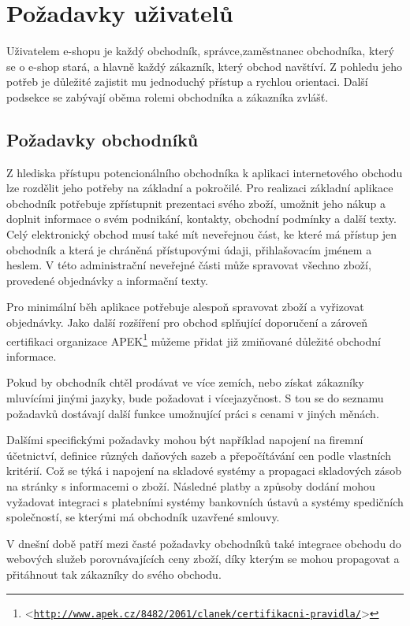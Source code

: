 \documentclass[11pt,twoside,a4paper]{book}
\let\oldUrl\url
\renewcommand\url[1]{<\texttt{\oldUrl{#1}}>}
\begin{document}
\section{Požadavky uživatelů}
\label{potreby3}
Uživatelem e-shopu je každý obchodník, správce,zaměstnanec obchodníka, který se o e-shop stará, a hlavně každý zákazník, který obchod navštíví. Z pohledu jeho potřeb je důležité zajistit mu jednoduchý přístup a rychlou orientaci. Další podsekce se zabývají oběma rolemi obchodníka a zákazníka zvlášť. 

\subsection{Požadavky obchodníků}
\label{potreby1}
Z hlediska přístupu potencionálního obchodníka k aplikaci internetového obchodu lze rozdělit jeho potřeby na základní a pokročilé. Pro realizaci základní aplikace obchodník potřebuje zpřístupnit prezentaci svého zboží, umožnit jeho nákup a doplnit informace o svém podnikání, kontakty, obchodní podmínky a další texty. Celý elektronický obchod musí také mít neveřejnou část, ke které má přístup jen obchodník a která je chráněná přístupovými údaji, přihlašovacím jménem a heslem. V této administrační neveřejné části může spravovat všechno zboží, provedené objednávky a informační texty.

Pro minimální běh aplikace potřebuje alespoň spravovat zboží a vyřizovat objednávky. Jako další rozšíření pro obchod splňující doporučení a zároveň certifikaci organizace APEK\footnote{\url{http://www.apek.cz/8482/2061/clanek/certifikacni-pravidla/}} můžeme přidat již zmiňované důležité obchodní informace.

Pokud by obchodník chtěl prodávat ve více zemích, nebo získat zákazníky mluvícími jinými jazyky, bude požadovat i vícejazyčnost. S tou se do seznamu požadavků dostávají další funkce umožnující práci s cenami v jiných měnách. 

Dalšími specifickými požadavky mohou být například napojení na firemní účetnictví, definice různých daňových sazeb a přepočítávání cen podle vlastních kritérií. Což se týká i napojení na skladové systémy a propagaci skladových zásob na stránky s informacemi o zboží. Následné platby a způsoby dodání mohou vyžadovat integraci s platebními systémy bankovních ústavů a systémy spedičních společností, se kterými má obchodník uzavřené smlouvy.

V dnešní době patří mezi časté požadavky obchodníků také integrace obchodu do webových služeb porovnávajících ceny zboží, díky kterým se mohou propagovat a přitáhnout tak zákazníky do svého obchodu.
\end{document}
